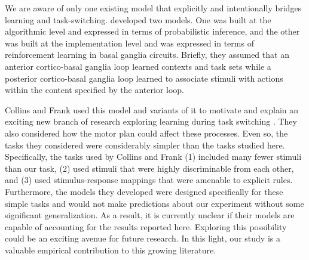 \documentclass[doc, floatsintext]{apa7}
\begin{document}
We are aware of only one existing model that explicitly and
intentionally bridges learning and task-switching.
\cite{collins_cognitive_2013} developed two models. One was
built at the algorithmic level and expressed in terms of
probabilistic inference, and the other was built at the
implementation level and was expressed in terms of
reinforcement learning in basal ganglia circuits. Briefly,
they assumed that an anterior cortico-basal ganglia loop
learned contexts and task sets while a posterior
cortico-basal ganglia loop learned to associate stimuli with
actions within the content specified by the anterior loop. 

Collins and Frank used this model and variants of it to
motivate and explain an exciting new branch of research
exploring learning during task switching
\parencite{collins_cognitive_2013, collins_human_2014,
collins_neural_2016, collins_motor_2016, collins_cost_2017}.
They also considered how the motor plan could affect these
processes. Even so, the tasks they considered were
considerably simpler than the tasks studied here.
Specifically, the tasks used by Collins and Frank (1)
included many fewer stimuli than our task, (2) used stimuli
that were highly discriminable from each other, and (3) used
stimulus-response mappings that were amenable to explicit
rules. Furthermore, the models they developed were designed
specifically for these simple tasks and would not make
predictions about our experiment without some significant
generalization. As a result, it is currently unclear if
their models are capable of accounting for the results
reported here. Exploring this possibility could be an
exciting avenue for future research. In this light, our
study is a valuable empirical contribution to this growing
literature.
\end{document}

